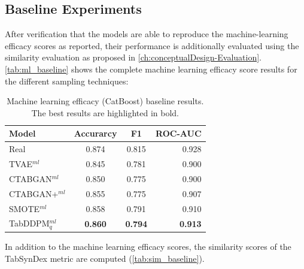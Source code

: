 \subsection{Baseline Experiments}
\label{ch:Baseline}

After verification that the models are able to reproduce the machine-learning efficacy scores as reported,
their performance is additionally evaluated using the similarity evaluation as proposed in \autoref{ch:conceptualDesign-Evaluation}.
\autoref{tab:ml_baseline} shows the complete machine learning efficacy score results for the different sampling techniques:

\begin{table}[h]
	\centering
	\begin{tabular}{lccr}
		\toprule
		\textbf{Model}     & \textbf{Accurarcy} & \textbf{F1}    & \textbf{ROC-AUC} \\ 
		\midrule
		Real               & 0.874              & 0.815          & 0.928            \\ 
		TVAE$^{ml}$        & 0.845              & 0.781          & 0.900            \\ 
		CTABGAN$^{ml}$     & 0.850              & 0.775          & 0.900            \\ 
		CTABGAN+$^{ml}$    & 0.855              & 0.775          & 0.907            \\ 
		SMOTE$^{ml}$       & 0.858              & 0.791          & 0.910            \\ 
		TabDDPM$^{ml}_{q}$ & \textbf{0.860}     & \textbf{0.794} & \textbf{0.913}   \\ 
		\bottomrule
	\end{tabular}
	\caption[Machine learning efficacy baseline]{Machine learning efficacy (CatBoost) baseline results. The best results are highlighted in bold.}
	\label{tab:ml_baseline}
\end{table}


In addition to the machine learning efficacy scores, the similarity scores of the TabSynDex metric are computed (\autoref{tab:sim_baseline}).

